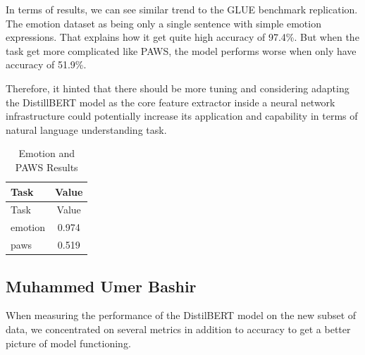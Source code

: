 \documentclass[
  11pt,
]{article}
\begin{document}
In terms of results, we can see similar trend to the GLUE benchmark
replication. The emotion dataset as being only a single sentence with
simple emotion expressions. That explains how it get quite high accuracy
of 97.4\%. But when the task get more complicated like PAWS, the model
performs worse when only have accuracy of 51.9\%.

Therefore, it hinted that there should be more tuning and considering
adapting the DistillBERT model as the core feature extractor inside a
neural network infrastructure could potentially increase its application
and capability in terms of natural language understanding task.

\begin{longtable}[]{@{}lc@{}}
\caption{Emotion and PAWS Results}\tabularnewline
\toprule\noalign{}
Task & Value \\
\midrule\noalign{}
\endfirsthead
\toprule\noalign{}
Task & Value \\
\midrule\noalign{}
\endhead
\bottomrule\noalign{}
\endlastfoot
emotion & 0.974 \\
paws & 0.519 \\
\end{longtable}

\subsection{Muhammed Umer Bashir}\label{muhammed-umer-bashir}

When measuring the performance of the DistilBERT model on the new subset
of data, we concentrated on several metrics in addition to accuracy to
get a better picture of model functioning.
\end{document}
